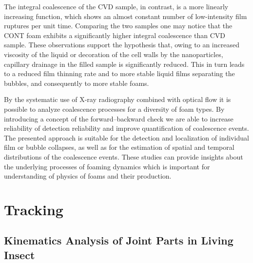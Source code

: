 The integral coalescence of the CVD sample, in contrast, is
a more linearly increasing function, which shows an almost constant
number of low-intensity film ruptures per unit time. Comparing the two samples one may notice that the CONT foam exhibits a significantly higher integral coalescence than CVD sample.
These observations support the hypothesis that, owing to an
increased viscosity of the liquid or decoration of the cell walls
by the nanoparticles, capillary drainage in the filled sample is
significantly reduced. This in turn leads to a reduced film
thinning rate and to more stable liquid films separating the
bubbles, and consequently to more stable foams.

By the systematic use of X-ray radiography combined with optical flow it is possible to analyze coalescence processes for
a diversity of foam types. By introducing a concept of the
forward–backward check we are able to increase reliability of detection
reliability and improve quantification of coalescence events.
The presented approach is suitable for the detection and
localization of individual film or bubble collapses, as well as for
the estimation of spatial and temporal distributions of the
coalescence events. These studies can provide insights about the underlying processes of foaming dynamics which is important for understanding of physics of foams and their production.







         



\newpage


\section{Tracking}

\subsection{Kinematics Analysis of Joint Parts in Living Insect}
\label{app_kinematics_insects}


